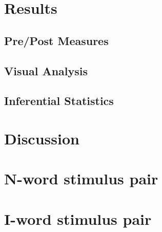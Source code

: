 \documentclass[man,a4paper,biblatex]{apa6}
\begin{document}
\section{Results}
\subsection{Pre/Post Measures}
\subsection{Visual Analysis}
\subsection{Inferential Statistics}

\section{Discussion}

\printbibliography
\appendix
\section{N-word stimulus pair}
\section{I-word stimulus pair}
\end{document}
